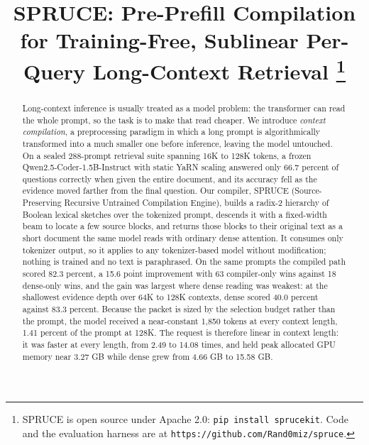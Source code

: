 \documentclass[conference]{IEEEtran}
\begin{document}
\title{SPRUCE: Pre-Prefill Compilation for Training-Free, Sublinear Per-Query Long-Context Retrieval
\thanks{SPRUCE is open source under Apache 2.0: \texttt{pip install sprucekit}. Code
and the evaluation harness are at \texttt{https://github.com/Rand0miz/spruce}.}}
\author{
\and
{}
}
\maketitle
\begin{abstract}
Long-context inference is usually treated as a model problem: the transformer can
read the whole prompt, so the task is to make that read cheaper. We introduce
\emph{context compilation}, a preprocessing paradigm in which a long prompt is
algorithmically transformed into a much smaller one before inference, leaving the
model untouched. On a sealed 288-prompt retrieval suite spanning 16K to 128K tokens, a frozen
Qwen2.5-Coder-1.5B-Instruct with static YaRN scaling answered only 66.7 percent
of questions correctly when given the entire document, and its accuracy fell as the
evidence moved farther from the final question. Our compiler, SPRUCE (Source-Preserving Recursive Untrained Compilation Engine), builds a
radix-2 hierarchy of Boolean lexical sketches over the tokenized prompt, descends it
with a fixed-width beam to locate a few source blocks, and returns those blocks to
their original text as a short document the same model reads with ordinary dense
attention. It consumes only tokenizer output, so it applies to any tokenizer-based
model without modification; nothing is trained and no text is paraphrased. On the same prompts the compiled path
scored 82.3 percent, a 15.6 point improvement with 63 compiler-only wins against 18
dense-only wins, and the gain was largest where dense reading was weakest: at the
shallowest evidence depth over 64K to 128K contexts, dense scored 40.0 percent
against 83.3 percent. Because the packet is sized by the selection budget rather than
the prompt, the model received a near-constant 1,850 tokens at every context length,
1.41 percent of the prompt at 128K. The request is therefore linear in context
length: it was faster at every length, from 2.49 to 14.08 times, and held peak
allocated GPU memory near 3.27 GB while dense grew from 4.66 GB to 15.58 GB.
\end{abstract}
\end{document}
